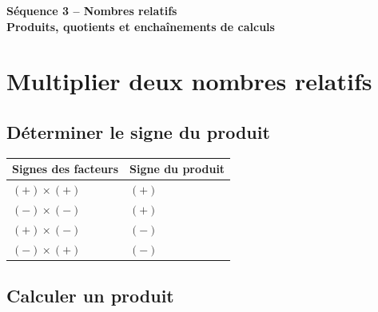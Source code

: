 \documentclass[12pt,a4paper]{article}
\begin{document}
\begin{center}
  {\sffamily\LARGE\bfseries\color{TitreC}
  Séquence 3 -- Nombres relatifs}\\[0.2em]

  {\sffamily\large\bfseries\color{SavoirC}
  Produits, quotients et enchaînements de calculs}
\end{center}

\section{Multiplier deux nombres relatifs}

\subsection{Déterminer le signe du produit}


\begin{center}
\renewcommand{\arraystretch}{1.45}
\begin{tabularx}{0.82\textwidth}{
|>{\centering\arraybackslash}X
|>{\centering\arraybackslash}X|}
\hline
\textbf{Signes des facteurs}
&
\textbf{Signe du produit}
\\
\hline
\((+)\times(+)\)
&
\((+)\)
\\
\hline
\((- )\times(- )\)
&
\((+)\)
\\
\hline
\((+)\times(- )\)
&
\((- )\)
\\
\hline
\((- )\times(+)\)
&
\((- )\)
\\
\hline
\end{tabularx}
\end{center}

\subsection{Calculer un produit}

\end{document}
